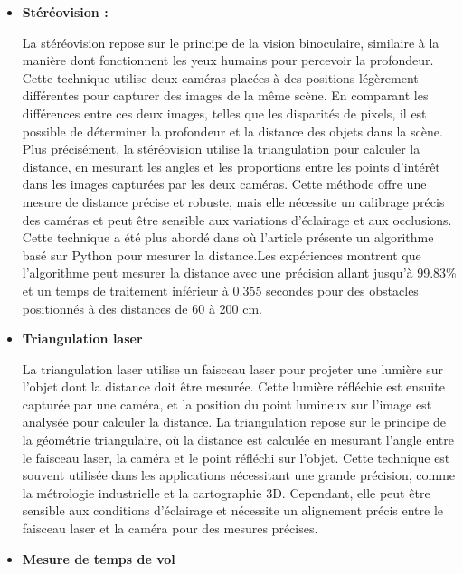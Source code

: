 \begin{itemize}[label={\Huge$\star$}]
 	
 	\item \textbf{Stéréovision :}
 	
 	La stéréovision repose sur le principe de la vision binoculaire, similaire à la manière dont fonctionnent les yeux humains pour percevoir la profondeur. Cette technique utilise deux caméras placées à des positions légèrement différentes pour capturer des images de la même scène. En comparant les différences entre ces deux images, telles que les disparités de pixels, il est possible de déterminer la profondeur et la distance des objets dans la scène. Plus précisément, la stéréovision utilise la triangulation pour calculer la distance, en mesurant les angles et les proportions entre les points d'intérêt dans les images capturées par les deux caméras. Cette méthode offre une mesure de distance précise et robuste, mais elle nécessite un calibrage précis des caméras et peut être sensible aux variations d'éclairage et aux occlusions. Cette technique a été plus abordé dans \cite{adil_novel_2022} où l’article présente un algorithme basé sur Python pour mesurer la distance.Les expériences montrent que l’algorithme peut mesurer la distance avec une précision allant jusqu’à 99.83\% et un temps de traitement inférieur à 0.355 secondes pour des obstacles positionnés à des distances de 60 à 200 cm.
 	
 	\item \textbf{Triangulation laser}
 	
 	La triangulation laser utilise un faisceau laser pour projeter une lumière sur l'objet dont la distance doit être mesurée. Cette lumière réfléchie est ensuite capturée par une caméra, et la position du point lumineux sur l'image est analysée pour calculer la distance. La triangulation repose sur le principe de la géométrie triangulaire, où la distance est calculée en mesurant l'angle entre le faisceau laser, la caméra et le point réfléchi sur l'objet. Cette technique est souvent utilisée dans les applications nécessitant une grande précision, comme la métrologie industrielle et la cartographie 3D. Cependant, elle peut être sensible aux conditions d'éclairage et nécessite un alignement précis entre le faisceau laser et la caméra pour des mesures précises.
 	
 	\item \textbf{Mesure de temps de vol }
 	

\end{itemize}
